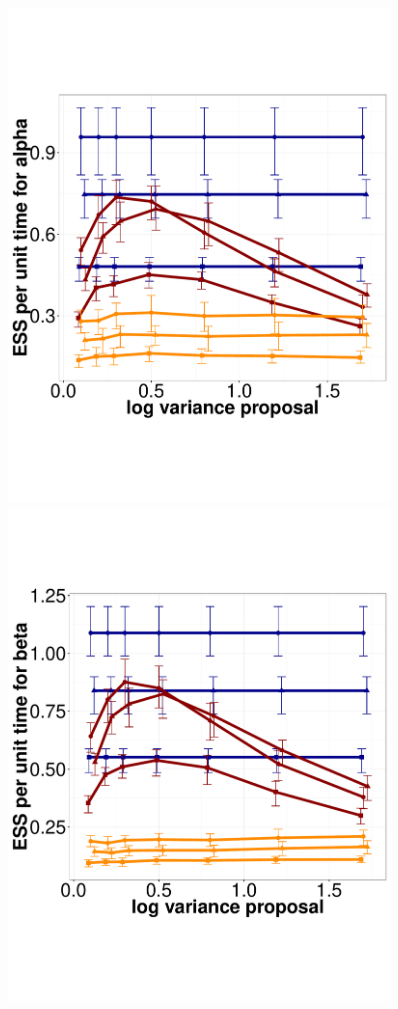  \begin{figure}%
  \centering
  \begin{minipage}[!hp]{0.45\linewidth}
  \centering
    \includegraphics [width=0.90\textwidth, angle=0]{figs/q_10_alpha.pdf}
      \end{minipage}
  \begin{minipage}[hp]{0.45\linewidth}
  \centering
    \includegraphics [width=0.90\textwidth, angle=0]{figs/q_10_beta.pdf}

\end{minipage}
\end{figure}
